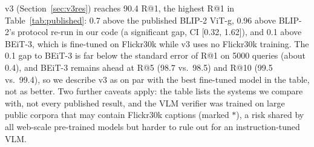\documentclass[conference]{IEEEtran}
\begin{document}
v3 (Section~\ref{sec:v3res}) reaches 90.4 R@1, the highest R@1 in Table~\ref{tab:published}: 0.7 above the
published BLIP-2 ViT-g, 0.96 above BLIP-2's protocol re-run in our code (a significant gap, CI [0.32, 1.62]), and
0.1 above BEiT-3, which is fine-tuned on Flickr30k while v3 uses no Flickr30k training. The 0.1 gap to BEiT-3 is
far below the standard error of R@1 on 5000 queries (about 0.4), and BEiT-3 remains ahead at R@5 (98.7 vs.\ 98.5)
and R@10 (99.5 vs.\ 99.4), so we describe v3 as on par with the best fine-tuned model in the table, not as better.
Two further caveats apply: the table lists the systems we compare with, not every published result, and the VLM
verifier was trained on large public corpora that may contain Flickr30k captions (marked $\ast$), a risk shared by
all web-scale pre-trained models but harder to rule out for an instruction-tuned VLM.
\end{document}
